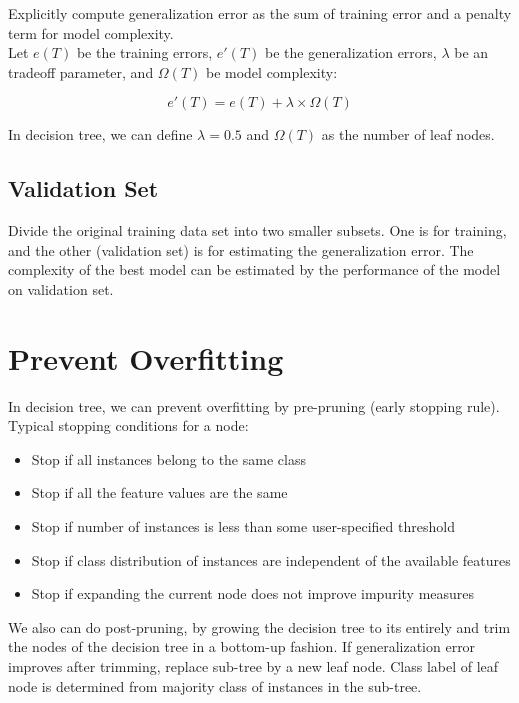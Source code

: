 \begin{multicols*}{2}
\noindent Explicitly compute generalization error as the sum of training error and a penalty term for model complexity. \\

\noindent Let $e(T)$ be the training errors, $e'(T)$ be the generalization errors, $\lambda$ be an tradeoff parameter, and $\Omega(T)$ be model complexity:

$$e'(T)=e(T) + \lambda \times \Omega(T)$$

\noindent In decision tree, we can define $\lambda=0.5$ and $\Omega(T)$ as the number of leaf nodes. 

\subsection{Validation Set}

Divide the original training data set into two smaller subsets. One is for training, and the other (validation set) is for estimating the generalization error. The complexity of the best model can be estimated by the performance of the model on validation set. 

\section{Prevent Overfitting}

\noindent In decision tree, we can prevent overfitting by pre-pruning (early stopping rule). Typical stopping conditions for a node:

\begin{itemize}
    \item Stop if all instances belong to the same class
    \item Stop if all the feature values are the same
    \item Stop if number of instances is less than some user-specified threshold
    \item Stop if class distribution of instances are independent of the available features
    \item Stop if expanding the current node does not improve impurity measures
\end{itemize}

\noindent We also can do post-pruning, by growing the decision tree to its entirely and trim the nodes of the decision tree in a bottom-up fashion. If generalization error improves after trimming, replace sub-tree by a new leaf node. Class label of leaf node is determined from majority class of instances in the sub-tree. 


\end{multicols*}
